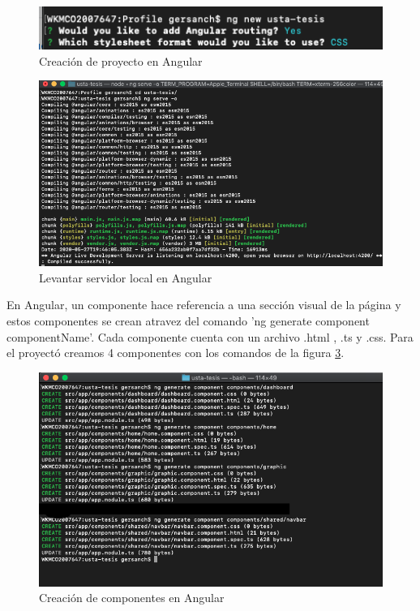         \begin{figure}[H]
            \begin{center}
                \includegraphics[width = 15cm]{3Proyecto/ngNew}
                \caption{ Creación de proyecto en Angular} 
                \label{fig:ngNew}
           \end{center}
        \end{figure}
        \begin{figure}[H]
            \begin{center}
                \includegraphics[width = 15cm]{3Proyecto/ngServe}
                \caption{ Levantar servidor local en Angular} 
                \label{fig:ngServe}
           \end{center}
        \end{figure}
        En Angular, un componente hace referencia a una sección visual de la página y estos componentes se crean atravez del comando 'ng generate component componentName'. Cada componente cuenta con un archivo .html , .ts y .css. Para el proyectó creamos 4 componentes con los comandos de la figura \ref{fig:ngComponents}.\\
        \begin{figure}[H]
            \begin{center}
                \includegraphics[width = 15cm]{3Proyecto/ngComponents}
                \caption{ Creación de componentes en Angular} 
                \label{fig:ngComponents}
            \end{center}
        \end{figure}

